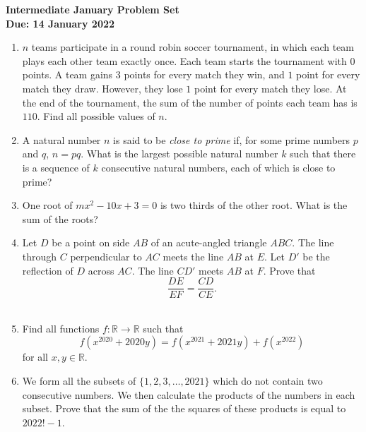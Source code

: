 \documentclass{article}
\begin{document}
\thispagestyle{empty}

\begin{center}
  \textbf{\Large Intermediate January Problem Set}
  \\ \vspace{1em}
  \textbf{\large Due: 14 January 2022}
\end{center}

\bigskip

\begin{enumerate}[itemsep=\fill]

\item %
$n$ teams participate in a round robin soccer tournament, in which each team plays each other team exactly once. Each team starts the tournament with $0$ points. A team gains $3$ points for every match they win, and $1$ point for every match they draw. However, they lose $1$ point for every match they lose. At the end of the tournament, the sum of the number of points each team has is $110$. Find all possible values of $n$.

\item %
A natural number $n$ is said to be \textit{close to prime} if, for some prime numbers $p$ and $q$, $n = pq$. What is the largest possible natural number $k$ such that there is a sequence of $k$ consecutive natural numbers, each of which is close to prime?


\item %
One root of $mx^2 - 10x + 3 = 0$ is two thirds of the other root. What is the sum of the roots?


\item %
Let $D$ be a point on side $AB$ of an acute-angled triangle $ABC$.
The line through $C$ perpendicular to $AC$ meets the line $AB$ at $E$.
Let $D'$ be the reflection of $D$ across $AC$.
The line $CD'$ meets $AB$ at $F$.
Prove that
\[ \frac{DE}{EF} = \frac{CD}{CE}. \]
~ \vspace{-12pt}


\item %
Find all functions $f : \mathbb{R} \to \mathbb{R}$ such that
\[ f(x^{2020} +2020y) = f(x^{2021} +2021y) +f(x^{2022}) \]
for all $x,y \in \mathbb{R}$.


\item %
We form all the subsets of $\{1, 2, 3, \dotsc, 2021\}$ which do not contain two consecutive numbers.
We then calculate the products of the numbers in each subset.
Prove that the sum of the the squares of these products is equal to $2022! -1$.

\end{enumerate}
\end{document}
